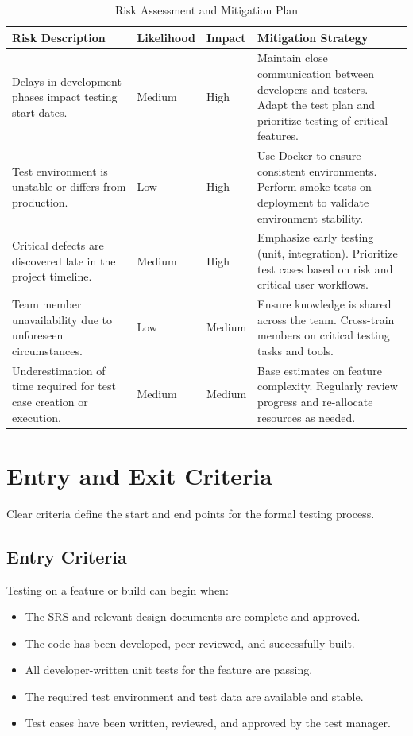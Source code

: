 \begin{table}[H]
    \centering
    \caption{Risk Assessment and Mitigation Plan}
    \label{tab:risk_management}
    \begin{tabular}{|p{4cm}|l|l|p{5cm}|}
        \hline
        \textbf{Risk Description} & \textbf{Likelihood} & \textbf{Impact} & \textbf{Mitigation Strategy} \\
        \hline
        Delays in development phases impact testing start dates. & Medium & High & Maintain close communication between developers and testers. Adapt the test plan and prioritize testing of critical features. \\
        \hline
        Test environment is unstable or differs from production. & Low & High & Use Docker to ensure consistent environments. Perform smoke tests on deployment to validate environment stability. \\
        \hline
        Critical defects are discovered late in the project timeline. & Medium & High & Emphasize early testing (unit, integration). Prioritize test cases based on risk and critical user workflows. \\
        \hline
        Team member unavailability due to unforeseen circumstances. & Low & Medium & Ensure knowledge is shared across the team. Cross-train members on critical testing tasks and tools. \\
        \hline
        Underestimation of time required for test case creation or execution. & Medium & Medium & Base estimates on feature complexity. Regularly review progress and re-allocate resources as needed. \\
        \hline
    \end{tabular}
\end{table}

\section{Entry and Exit Criteria}
Clear criteria define the start and end points for the formal testing process.

\subsection{Entry Criteria}
Testing on a feature or build can begin when:
\begin{itemize}
    \item The SRS and relevant design documents are complete and approved.
    \item The code has been developed, peer-reviewed, and successfully built.
    \item All developer-written unit tests for the feature are passing.
    \item The required test environment and test data are available and stable.
    \item Test cases have been written, reviewed, and approved by the test manager.
\end{itemize}

